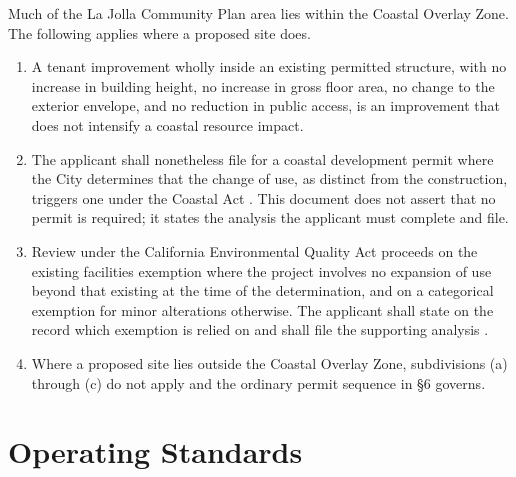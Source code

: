 Much of the La Jolla Community Plan area lies within the Coastal Overlay Zone.
The following applies where a proposed site does.

\begin{enumerate}
\item A tenant improvement wholly inside an existing permitted structure, with
  no increase in building height, no increase in gross floor area, no change to
  the exterior envelope, and no reduction in public access, is an improvement
  that does not intensify a coastal resource impact.

\item The applicant shall nonetheless file for a coastal development permit
  where the City determines that the change of use, as distinct from the
  construction, triggers one under the Coastal Act \cite{coastalact}. This
  document does not assert that no permit is required; it states the analysis
  the applicant must complete and file.

\item Review under the California Environmental Quality Act proceeds on the
  existing facilities exemption where the project involves no expansion of use
  beyond that existing at the time of the determination, and on a categorical
  exemption for minor alterations otherwise. The applicant shall state on the
  record which exemption is relied on and shall file the supporting analysis
  \cite{ceqa}.

\item Where a proposed site lies outside the Coastal Overlay Zone, subdivisions
  (a) through (c) do not apply and the ordinary permit sequence in §6 governs.
\end{enumerate}

\section{Operating Standards}

